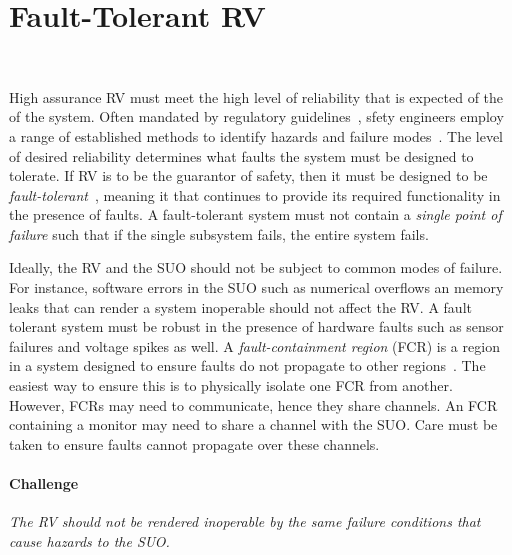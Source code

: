 \section{Fault-Tolerant RV}~\label{sec:ft}

 
High assurance  RV must meet the high level of reliability that is expected of
the of the system.  Often mandated by regulatory
guidelines~\cite{SAE4761}, sfety engineers employ a range of established
methods to identify hazards and failure modes~\cite{Levenson}. The level of desired
reliability determines what faults the system must be designed to
tolerate. If RV is to be the guarantor of safety, then it must be
designed to be \emph{fault-tolerant}~\cite{butler-faults}, meaning it
that continues to provide its required functionality in the presence
of faults.  A fault-tolerant system must not contain a \emph{single
  point of failure} such that if the single subsystem fails, the
entire system fails.


 Ideally, the RV and the SUO should not be subject to common
 modes of failure.  For instance, software errors in the SUO such as
 numerical overflows an memory leaks that can render a system
 inoperable should not affect the RV.  A fault tolerant system must
 be robust in the presence of hardware faults such as sensor failures
 and voltage spikes as well.  A \emph{fault-containment region} (FCR)
 is a region in a system designed to ensure faults do not propagate to
 other regions~\cite{Rushby01:buscompare}.   The 
 easiest way to ensure this is to physically isolate one FCR from
 another.  However, FCRs may need to communicate, hence they share
 channels. An FCR containing a monitor may need to share a channel
 with the SUO.  Care must be taken to ensure faults cannot propagate
 over these channels. 


\paragraph{Challenge}   \emph{The RV  should not be rendered inoperable by the
 same failure conditions that cause hazards to the SUO. }


